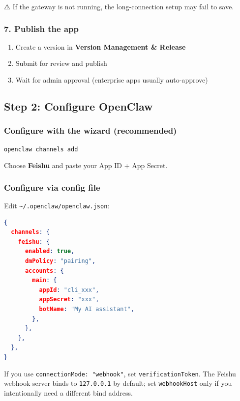 ⚠️ If the gateway is not running, the long-connection setup may fail to save.


\subsubsection{7. Publish the app}


\begin{enumerate}
  \item Create a version in \textbf{Version Management \& Release}
  \item Submit for review and publish
  \item Wait for admin approval (enterprise apps usually auto-approve)
\end{enumerate}


\hrulefill


\subsection{Step 2: Configure OpenClaw}


\subsubsection{Configure with the wizard (recommended)}


\begin{lstlisting}[language=bash]
openclaw channels add
\end{lstlisting}


Choose \textbf{Feishu} and paste your App ID + App Secret.

\subsubsection{Configure via config file}


Edit \texttt{\textasciitilde{}/.openclaw/openclaw.json}:

\begin{lstlisting}[language=json]
{
  channels: {
    feishu: {
      enabled: true,
      dmPolicy: "pairing",
      accounts: {
        main: {
          appId: "cli_xxx",
          appSecret: "xxx",
          botName: "My AI assistant",
        },
      },
    },
  },
}
\end{lstlisting}


If you use \texttt{connectionMode: "webhook"}, set \texttt{verificationToken}. The Feishu webhook server binds to \texttt{127.0.0.1} by default; set \texttt{webhookHost} only if you intentionally need a different bind address.

